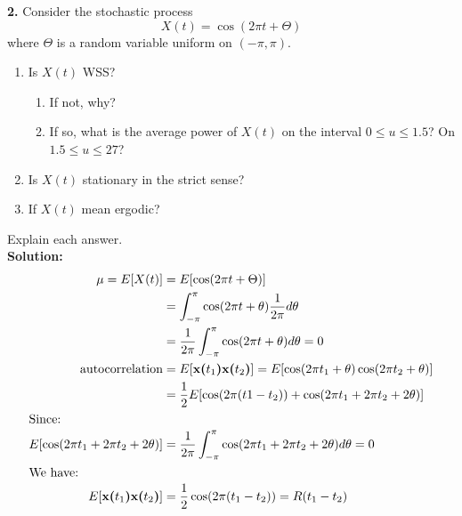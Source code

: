 \textbf{2.} Consider the stochastic process
  $$X(t)= \cos (2 \pi t + \Theta  )$$
  where $\Theta$ is  a random variable uniform on $(-\pi, \pi)$.
  \begin{enumerate}
  \item Is $X(t)$ WSS?
    \begin{enumerate}
    \item If not, why?
    \item If so, what is the average power of $X(t)$ on the interval $0\leq u \leq 1.5$? On $1.5\leq u \leq 27$?
    \end{enumerate}
  \item Is $X(t)$ stationary in the strict sense?
  \item If $X(t)$ mean ergodic?
  \end{enumerate}
  Explain each answer. \\

  \textbf{Solution:}\\

  \begin{align*}
    \mu = E[X(t)] & = E[\cos (2 \pi t + \Theta  )] \\
                  & = \int_{-\pi}^{\pi} \cos (2 \pi t + \theta  ) \dfrac{1}{2 \pi} d\theta \\
                  & = \dfrac{1}{2 \pi} \int_{-\pi}^{\pi} \cos (2 \pi t + \theta  ) d\theta  = 0 \\
    \text{autocorrelation} & = E[\textbf{x($t_1$)x($t_2$)}]
                             = E[\cos (2 \pi t_1 + \theta  )\cos (2 \pi t_2 + \theta  )] \\
                  & = \frac{1}{2}E[\cos (2 \pi (t1 - t_2)) + \cos (2\pi t_1 + 2\pi t_2 + 2\theta)]\\
    \shortintertext{Since:}
    E[\cos (2\pi t_1 + 2\pi t_2 + 2\theta)]
                  & = \dfrac{1}{2\pi} \int_{-\pi}^{\pi} \cos (2\pi t_1 + 2\pi t_2 + 2\theta) d\theta = 0 \\
    \shortintertext{We have:}
    E[\textbf{x($t_1$)x($t_2$)}] & = \dfrac{1}{2}\cos(2\pi (t_1 - t_2)) = R(t_1 - t_2)
  \end{align*}

